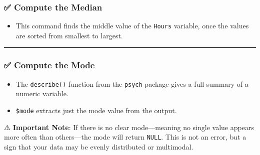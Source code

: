 \documentclass[
]{book}
\newenvironment{Shaded}{\begin{snugshade}}{\end{snugshade}}
\newcommand{\AttributeTok}[1]{\textcolor[rgb]{0.13,0.29,0.53}{#1}}
\newcommand{\ConstantTok}[1]{\textcolor[rgb]{0.56,0.35,0.01}{#1}}
\newcommand{\FunctionTok}[1]{\textcolor[rgb]{0.13,0.29,0.53}{\textbf{#1}}}
\newcommand{\NormalTok}[1]{#1}
\newcommand{\SpecialCharTok}[1]{\textcolor[rgb]{0.81,0.36,0.00}{\textbf{#1}}}
\providecommand{\tightlist}{%
  \setlength{\itemsep}{0pt}\setlength{\parskip}{0pt}}
\begin{document}
\subsubsection*{✅ Compute the Median}\label{compute-the-median}

\begin{Shaded}
\end{Shaded}

\begin{itemize}
\tightlist
\item
  This command finds the middle value of the \texttt{Hours} variable, once the values are sorted from smallest to largest.
\end{itemize}

\begin{center}\rule{0.5\linewidth}{0.5pt}\end{center}

\subsubsection*{✅ Compute the Mode}\label{compute-the-mode}

\begin{Shaded}
\end{Shaded}

\begin{itemize}
\tightlist
\item
  The \texttt{describe()} function from the \texttt{psych} package gives a full summary of a numeric variable.
\item
  \texttt{\$mode} extracts just the mode value from the output.
\end{itemize}

⚠️ \textbf{Important Note}: If there is no clear mode---meaning no single value appears more often than others---the mode will return \texttt{NULL}. This is not an error, but a sign that your data may be evenly distributed or multimodal.
\end{document}
